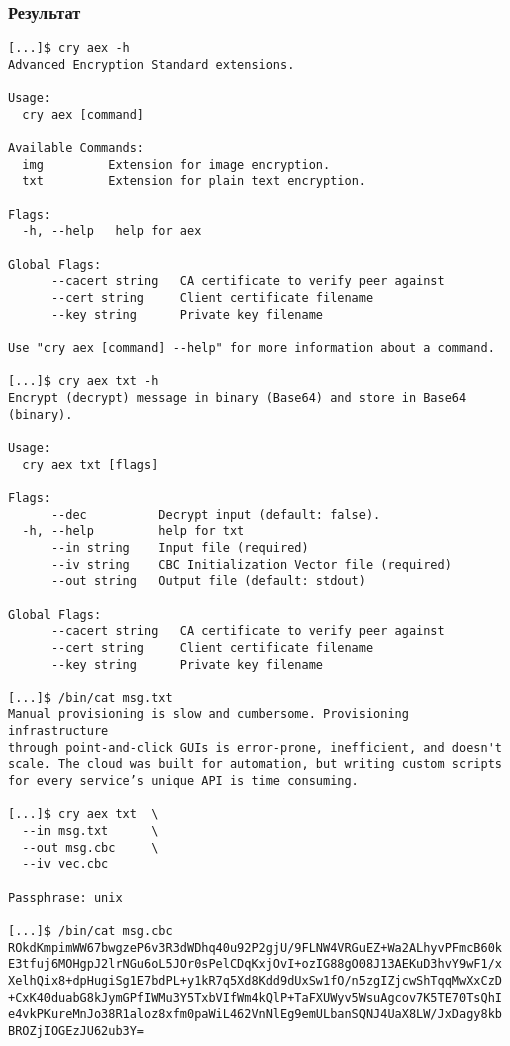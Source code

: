 \documentclass[12pt, a4paper]{article}
\begin{document}
\subsubsection{Результат}
\begin{verbatim}
[...]$ cry aex -h
Advanced Encryption Standard extensions.

Usage:
  cry aex [command]

Available Commands:
  img         Extension for image encryption.
  txt         Extension for plain text encryption.

Flags:
  -h, --help   help for aex

Global Flags:
      --cacert string   CA certificate to verify peer against
      --cert string     Client certificate filename
      --key string      Private key filename

Use "cry aex [command] --help" for more information about a command.

[...]$ cry aex txt -h
Encrypt (decrypt) message in binary (Base64) and store in Base64 (binary).

Usage:
  cry aex txt [flags]

Flags:
      --dec          Decrypt input (default: false).
  -h, --help         help for txt
      --in string    Input file (required)
      --iv string    CBC Initialization Vector file (required)
      --out string   Output file (default: stdout)

Global Flags:
      --cacert string   CA certificate to verify peer against
      --cert string     Client certificate filename
      --key string      Private key filename

[...]$ /bin/cat msg.txt
Manual provisioning is slow and cumbersome. Provisioning infrastructure 
through point-and-click GUIs is error-prone, inefficient, and doesn't 
scale. The cloud was built for automation, but writing custom scripts 
for every service’s unique API is time consuming.

[...]$ cry aex txt  \
  --in msg.txt      \
  --out msg.cbc     \
  --iv vec.cbc

Passphrase: unix

[...]$ /bin/cat msg.cbc
ROkdKmpimWW67bwgzeP6v3R3dWDhq40u92P2gjU/9FLNW4VRGuEZ+Wa2ALhyvPFmcB60k
E3tfuj6MOHgpJ2lrNGu6oL5JOr0sPelCDqKxjOvI+ozIG88gO08J13AEKuD3hvY9wF1/x
XelhQix8+dpHugiSg1E7bdPL+y1kR7q5Xd8Kdd9dUxSw1fO/n5zgIZjcwShTqqMwXxCzD
+CxK40duabG8kJymGPfIWMu3Y5TxbVIfWm4kQlP+TaFXUWyv5WsuAgcov7K5TE70TsQhI
e4vkPKureMnJo38R1aloz8xfm0paWiL462VnNlEg9emULbanSQNJ4UaX8LW/JxDagy8kb
BROZjIOGEzJU62ub3Y=


\end{verbatim}
\end{document}
